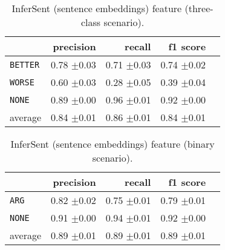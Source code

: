 	
	\begin{table}[htbp] 
		\centering 
		\caption{InferSent (sentence embeddings) feature (three-class scenario).} 

		\begin{tabular}{@{}lrrrr@{}}
			\toprule
			        & precision                & recall                   & f1 score                 \\ \midrule 
\texttt	{BETTER}	&	 0.78 \scriptsize{$\pm$0.03} &	 0.71 \scriptsize{$\pm$0.03} &	 0.74 \scriptsize{$\pm$0.02}  \\ 
\texttt	{WORSE}	&	 0.60 \scriptsize{$\pm$0.03} &	 0.28 \scriptsize{$\pm$0.05} &	 0.39 \scriptsize{$\pm$0.04}  \\ 
\texttt	{NONE}	&	 0.89 \scriptsize{$\pm$0.00} &	 0.96 \scriptsize{$\pm$0.01} &	 0.92 \scriptsize{$\pm$0.00}  \\ 
average	&	 0.84 \scriptsize{$\pm$0.01} &	 0.86 \scriptsize{$\pm$0.01} &	 0.84 \scriptsize{$\pm$0.01}  \\ 
			\bottomrule
		\end{tabular}
	\end{table}
	
	\begin{table}[htbp] 
		\centering 
		\caption{InferSent (sentence embeddings) feature (binary scenario).} 
		\label{  }
		\begin{tabular}{@{}lrrrr@{}}
			\toprule
			        & precision                & recall                   & f1 score                 \\ \midrule 
			\texttt{ARG}	&	 0.82 \scriptsize{$\pm$0.02} &	 0.75 \scriptsize{$\pm$0.01} &	 0.79 \scriptsize{$\pm$0.01}  \\ 
	\texttt{NONE}	&	 0.91 \scriptsize{$\pm$0.00} &	 0.94 \scriptsize{$\pm$0.01} &	 0.92 \scriptsize{$\pm$0.00}  \\ 
average	&	 0.89 \scriptsize{$\pm$0.01} &	 0.89 \scriptsize{$\pm$0.01} &	 0.89 \scriptsize{$\pm$0.01}  \\ 
			\bottomrule
		\end{tabular}
	\end{table}
	
